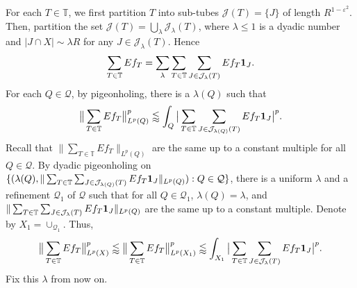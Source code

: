 \documentclass{amsart}
\numberwithin{equation}{section}
\newcommand{\e}{\varepsilon}
\newcommand{\la}{\lambda}
\newcommand{\cq}{\mathcal Q}
\newcommand{\cj}{\mathcal J}
\newcommand{\ZT}{\mathbb{T}}
\newcommand{\Id}{{\bf 1}}
\begin{document}
For each $T\in\ZT$, we first partition $T$ into sub-tubes $\cj(T)=\{J\}$ of length $R^{1-\e^2}$. 
Then, partition the set $\cj(T)=\bigcup_\la\cj_\la(T)$, where $\la\leq 1$ is a dyadic number and $|J\cap X|\sim \la R$ for any $J\in\cj_\la(T)$. 
Hence
\begin{equation}
    \sum_{T\in\ZT}Ef_T=\sum_{\la}\sum_{T\in\ZT}\sum_{J\in\cj_\la(T)}Ef_{T}\Id_J.    
\end{equation}
For each $Q\in\cq$, by pigeonholing, there is a $\la(Q)$ such that 
\begin{equation}
    \big\|\sum_{T\in\ZT}Ef_T\big\|_{L^p(Q)}^p\lessapprox\int_Q\big|\sum_{T\in\ZT}\sum_{J\in\cj_{\la(Q)}(T)}Ef_{T}\Id_J\big|^p.
\end{equation}
Recall that $\|\sum_{T\in\ZT}Ef_T\|_{L^p(Q)}$ are  the same up to a constant multiple for all $Q\in\cq$. 
By dyadic pigeonholing on $\{(\la(Q), \|\sum_{T\in\ZT}\sum_{J\in\cj_{\la(Q)}(T)}Ef_{T}\Id_J\|_{L^p(Q)}):Q\in\cq\}$, there is a uniform $\la$ and a refinement $\cq_1$ of $\cq$ such that for all $Q\in\cq_1$, $\la(Q)=\la$, and
$\|\sum_{T\in\ZT}\sum_{J\in\cj_\la(T)}Ef_{T}\Id_J\|_{L^p(Q)}$ are  the same up to a constant multiple.
Denote by $X_1=\cup_{\cq_1}$.
Thus, 
\begin{equation}
\label{first-refinement}
    \big\|\sum_{T\in\ZT}Ef_T\big\|_{L^p(X)}^p\lessapprox\big\|\sum_{T\in\ZT}Ef_T\big\|_{L^p(X_1)}^p\lessapprox\int_{X_1}\big|\sum_{T\in\ZT}\sum_{J\in\cj_\la(T)}Ef_{T}\Id_J\big|^p.
\end{equation}
Fix this $\la$ from now on.

\smallskip
\end{document}
